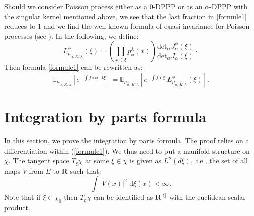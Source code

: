 \documentclass[11pt,a4paper]{amsart}
\begin{document}
Should we consider Poisson process either as a $0$-DPPP or as an
$\alpha$-DPPP with the singular kernel mentioned above, we see that
the last fraction in \eqref{formule1} reduces to $1$ and we find the
well known formula of quasi-invariance for Poisson processes (see
\cite{MR99d:58179}).  In the following, we define:
\begin{equation*}
  L^{\phi}_{\mu_{\alpha,\,K,\,\lambda}}(\xi)=\left(\prod_{x \in\xi}p^{\lambda}_{\phi}(x)\right)
  \frac{{{\text{det}}}_\alpha J_{\alpha}^{\phi}(\xi)}{{{\text{det}}}_\alpha J_{\alpha}(\xi)}\cdotp
\end{equation*}
Then formula \eqref{formule1} can be rewritten as:
\begin{equation*}
  {{\mathbb E}}_{\mu_{\alpha,\,K,\,\lambda}} \left[ e^{- \int{f\circ \phi\
        {\text{ d}}\xi}}    \right]
  ={{\mathbb E}}_{\mu_{\alpha,\,K,\,\lambda}}\left[e^{-\int f {\text{ d}}\xi }\ L^{\phi}_{\mu_{\alpha,\,K,\,\lambda}}(\xi)\right].
\end{equation*}

\section{Integration by parts formula}\label{Integration by parts}
In this section, we prove the integration by parts formula. The proof
relies on a differentiation within (\ref{formule1}). We thus need to
put a manifold structure on $\chi.$ The tangent space $T_\xi \chi$ at
some $\xi \in \chi$ is given as $L^2(d\xi),$ i.e., the set of all maps
$V$ from $E$ to ${{\mathbf R}}$ such that:
\begin{equation*}
  \int |V(x)|^2 {\text{ d}}\xi(x)<\infty.
\end{equation*}
Note that if $\xi\in \chi_0$ then $T_\xi\chi$ can be identified as
${{\mathbf R}}^{|\xi|}$ with the euclidean scalar product.
\end{document}
